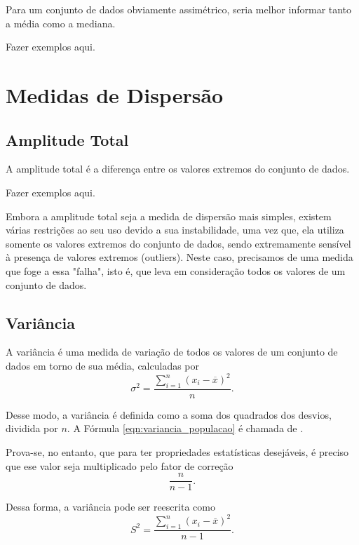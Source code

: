 \documentclass[11pt,fleqn]{book}
\numberwithin{mpicture}{chapter}
\numberwithin{mtable}{chapter}
\numberwithin{mframe}{chapter}
\begin{document}
\begin{remark}
	Para um conjunto de dados obviamente assimétrico, seria melhor informar tanto a média como a mediana.
\end{remark}

{\color{red}Fazer exemplos aqui.}

\section{Medidas de Dispersão}

\subsection{Amplitude Total}

A amplitude total é a diferença entre os valores extremos do conjunto de dados.

{\color{red}Fazer exemplos aqui.}

Embora a amplitude total seja a medida de dispersão mais simples, existem várias restrições ao seu uso devido a sua instabilidade, uma vez que, ela utiliza somente os valores extremos do conjunto de dados, sendo extremamente sensível à presença de valores extremos (outliers). Neste caso, precisamos de uma medida que foge a essa "falha", isto é, que leva em consideração todos os valores de um conjunto de dados.

\subsection{Variância}

A variância é uma medida de variação de todos os valores de um conjunto de dados em torno de sua média, calculadas por
\begin{equation}
	\label{eqn:variancia_populacao}
	\sigma ^2 = \frac{
		\displaystyle \sum_{i=1}^{n} (x_i - \overline{x})^2
	} {
		n
	} \text{.}
\end{equation}

Desse modo, a variância é definida como a soma dos quadrados dos desvios, dividida por $n$. A Fórmula \ref{eqn:variancia_populacao} é chamada de .

Prova-se, no entanto, que para ter propriedades estatísticas desejáveis, é preciso que ese valor seja multiplicado pelo fator de correção
\[
	\frac{n}{n-1}
	\text{.}
\]

Dessa forma, a variância pode ser reescrita como
\begin{equation}
	\label{eqn:variancia_amostras}
	S^2=\frac{
		\displaystyle \sum_{i=1}^{n} (x_i - \overline{x})^2
	} {
		n-1
	}\text{.}
\end{equation}
\end{document}
